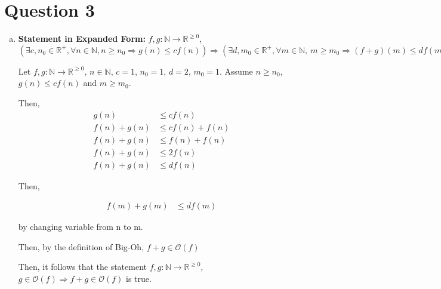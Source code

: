 \documentclass[12pt]{article}
\begin{document}
\section*{Question 3}
\begin{enumerate}[a.]
    \item

    \textbf{Statement in Expanded Form:} $f,g: \mathbb{N} \to \mathbb{R}^{\geq 0}$,
    $(\exists c,n_0 \in \mathbb{R}^{+}, \forall n \in \mathbb{N}, n \geq n_0 \Rightarrow
    g(n) \leq cf(n)) \Rightarrow (\exists d,m_0 \in \mathbb{R}^{+}, \forall m \in \mathbb{N},\:
    m \geq m_0 \Rightarrow (f+g)(m) \leq df(m))$

    \bigskip

    Let $f,g: \mathbb{N} \to \mathbb{R}^{\geq 0}$, $n \in \mathbb{N}$, $c = 1$,
    $n_0 = 1$, $d = 2$, $m_0 = 1$. Assume $n \geq n_0$, $g(n) \leq c f(n)$ and
    $m \geq m_0$.

    \bigskip

    Then,
    \setcounter{equation}{0}
    \begin{align}
        g(n) &\leq c f(n)\\
        f(n) + g(n) &\leq c f(n) + f(n)\\
        f(n) + g(n) &\leq f(n) + f(n)\\
        f(n) + g(n) &\leq 2 f(n)\\
        f(n) + g(n) &\leq d f(n)
    \end{align}

    \bigskip

    Then,

    \begin{align}
        f(m) + g(m) &\leq d f(m)
    \end{align}

    by changing variable from n to m.

    \bigskip

    Then, by the definition of Big-Oh, $f +g \in \mathcal{O}(f)$

    \bigskip

    Then, it follows that the statement $f,g: \mathbb{N} \to \mathbb{R}^{\geq 0}$,
    $g \in \mathcal{O}(f) \Rightarrow f + g \in \mathcal{O}(f)$ is true.
\end{enumerate}
\end{document}
